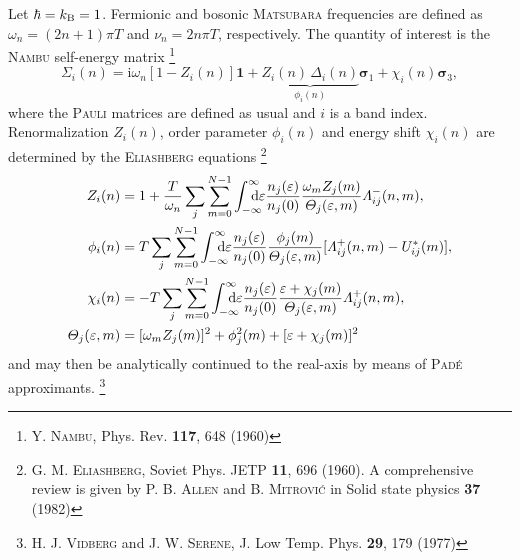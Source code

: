 \documentclass[a4paper]{article}
\def\D{\mathrm d}
\def\I{\mathrm i}
\def\sub#1{\sb{\mathrm{#1}}}
\def\from#1{\sb{\mathrlap{#1}}}
\def\till#1{\sp{\mathrlap{#1}}}
\let\vec\boldsymbol
\let\Delta\varDelta
\let\epsilon\varepsilon
\let\Lambda\varLambda
\let\Sigma\varSigma
\let\Theta\varTheta
\begin{document}
   Let $\hbar = k \sub B = 1$. Fermionic and bosonic \textsc{Matsubara}
   frequencies are defined as $\omega_n = (2 n + 1) \pi T$ and $\nu_n = 2 n \pi
   T$, respectively. The quantity of interest is the \textsc{Nambu} self-energy
   matrix%
   \footnote{Y. \textsc{Nambu}, Phys. Rev. \textbf{117}, 648 (1960)}
   \begin{equation*}
      \vec \Sigma_i(n)
      = \I \omega_n [1 - Z_i(n)] \vec 1
      + \underbrace{Z_i(n) \, \Delta_i(n)}
      _ {\displaystyle \phi_i(n)} \vec \sigma_1
      + \chi_i(n) \vec \sigma_3,
   \end{equation*}
   where the \textsc{Pauli} matrices are defined as usual and $i$ is a band
   index. Renormalization $Z_i(n)$, order parameter $\phi_i(n)$ and energy shift
   $\chi_i(n)$ are determined by the \textsc{Eliashberg} equations%
   \footnote{%
      G. M. \textsc{Eliashberg}, Soviet Phys. JETP \textbf{11}, 696 (1960).
      \newline
      A comprehensive review is given by P. B. \textsc{Allen} and B.
      \textsc{Mitrović} in Solid state physics \textbf{37} (1982)
      }
   \begin{equation}
      \begin{split}
         Z_i(n) &= 1 + \frac T {\omega_n} \sum_j \sum_{m = 0}^{N - 1}
         \int \from{-\infty} \till \infty \D \epsilon
         \frac{n_j(\epsilon)}{n_j(0)}
         \frac{\omega_m Z_j (m)}{\Theta_j(\epsilon, m)}
         \Lambda_{i j}^-(n, m),
         \\
         \phi_i(n) &= T \sum_j \sum_{m = 0}^{N - 1}
         \int \from{-\infty} \till \infty \D \epsilon
         \frac{n_j(\epsilon)}{n_j(0)}
         \frac{\phi_j(m)}{\Theta_j(\epsilon, m)}
         [\Lambda_{i j}^+(n, m) - U^*_{i j}(m)],
         \\
         \chi_i(n) &= -T \sum_j \sum_{m = 0}^{N - 1}
         \int \from{-\infty} \till \infty \D \epsilon
         \frac{n_j(\epsilon)}{n_j(0)}
         \frac{\epsilon + \chi_j(m)}{\Theta_j(\epsilon, m)}
         \Lambda_{i j}^+(n, m),
         \\
         \Theta_j(\epsilon, m) &=
         [\omega_m Z_j(m)]^2 + \phi_j^2(m) + [\epsilon + \chi_j(m)]^2
      \end{split}
      \label{Eliashberg equations}
   \end{equation}
   and may then be analytically continued to the real-axis by means of
   \textsc{Padé} approximants.%
   \footnote{%
      H. J. \textsc{Vidberg} and J. W. \textsc{Serene}, J. Low Temp. Phys.
      \textbf{29}, 179 (1977)
      }
\end{document}
